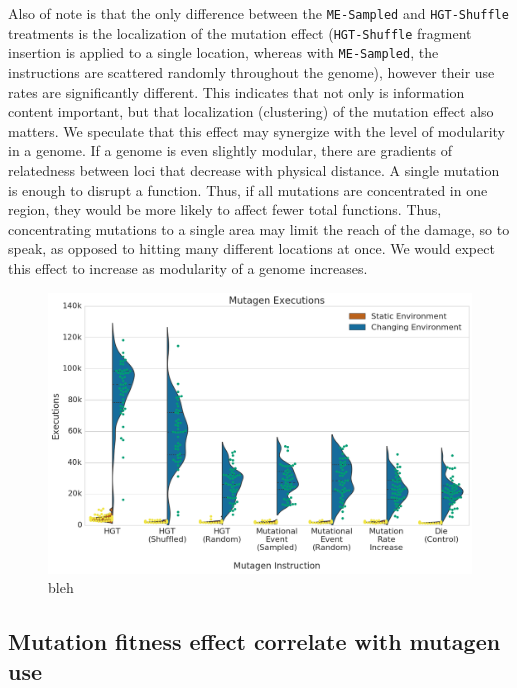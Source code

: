 \documentclass[PhD]{msu-thesis}
\begin{document}
Also of note is that the only difference between the \texttt{ME-Sampled} and \texttt{HGT-Shuffle} treatments is the localization of the mutation effect
(\texttt{HGT-Shuffle} fragment insertion is applied to a single location, whereas with \texttt{ME-Sampled}, the instructions are scattered randomly throughout the genome), however their use rates are significantly different. This indicates that not only is information content important, but that localization (clustering) of the mutation effect also matters.
We speculate that this effect may synergize with the level of modularity in a genome. If a genome is even slightly modular, there are gradients of relatedness between loci that decrease with physical distance. A single mutation is enough to disrupt a function. Thus, if all mutations are concentrated in one region, they would be more likely to affect fewer total functions.  Thus, concentrating mutations to a single area may limit the reach of the damage, so to speak, as opposed to hitting many different locations at once. We would expect this effect to increase as modularity of a genome increases.

\begin{figure}[h!]
\begin{center}
\includegraphics[width=0.7\columnwidth]{figures/HGT/mutagen_execution.png}
\caption{bleh
}\label{fig:mutagen_execution}
\end{center}
\end{figure}



\subsection{Mutation fitness effect correlate with mutagen use}
\end{document}
